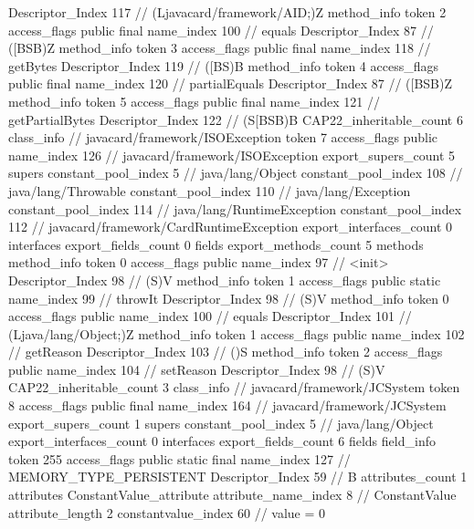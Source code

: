 {{{{{					Descriptor_Index	117		// (Ljavacard/framework/AID;)Z
				}
				method_info {
					token	2
					access_flags	public final
					name_index	100		// equals
					Descriptor_Index	87		// ([BSB)Z
				}
				method_info {
					token	3
					access_flags	public final
					name_index	118		// getBytes
					Descriptor_Index	119		// ([BS)B
				}
				method_info {
					token	4
					access_flags	public final
					name_index	120		// partialEquals
					Descriptor_Index	87		// ([BSB)Z
				}
				method_info {
					token	5
					access_flags	public final
					name_index	121		// getPartialBytes
					Descriptor_Index	122		// (S[BSB)B
				}
			}
			CAP22_inheritable_count	6
		}
		class_info {		// javacard/framework/ISOException
			token	7
			access_flags	public
			name_index	126		// javacard/framework/ISOException
			export_supers_count	5
			supers {
				constant_pool_index	5		// java/lang/Object
				constant_pool_index	108		// java/lang/Throwable
				constant_pool_index	110		// java/lang/Exception
				constant_pool_index	114		// java/lang/RuntimeException
				constant_pool_index	112		// javacard/framework/CardRuntimeException
			}
			export_interfaces_count	0
			interfaces {
			}
			export_fields_count	0
			fields {
			}
			export_methods_count	5
			methods {
				method_info {
					token	0
					access_flags	public
					name_index	97		// <init>
					Descriptor_Index	98		// (S)V
				}
				method_info {
					token	1
					access_flags	public static
					name_index	99		// throwIt
					Descriptor_Index	98		// (S)V
				}
				method_info {
					token	0
					access_flags	public
					name_index	100		// equals
					Descriptor_Index	101		// (Ljava/lang/Object;)Z
				}
				method_info {
					token	1
					access_flags	public
					name_index	102		// getReason
					Descriptor_Index	103		// ()S
				}
				method_info {
					token	2
					access_flags	public
					name_index	104		// setReason
					Descriptor_Index	98		// (S)V
				}
			}
			CAP22_inheritable_count	3
		}
		class_info {		// javacard/framework/JCSystem
			token	8
			access_flags	public final
			name_index	164		// javacard/framework/JCSystem
			export_supers_count	1
			supers {
				constant_pool_index	5		// java/lang/Object
			}
			export_interfaces_count	0
			interfaces {
			}
			export_fields_count	6
			fields {
			field_info {
				token	255
				access_flags	public static final
				name_index	127		// MEMORY_TYPE_PERSISTENT
				Descriptor_Index	59		// B
				attributes_count	1
				attributes {
				ConstantValue_attribute {
					attribute_name_index	8		// ConstantValue
					attribute_length	2
					constantvalue_index	60		// value = 0
}}}}}}}
